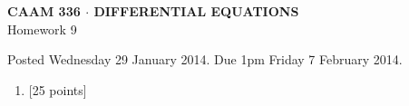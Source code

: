 \documentclass[10pt]{article}
\begin{document}
\vspace*{-5em}
\begin{center}
\large \textsf{\textbf{CAAM 336 $\cdot$ DIFFERENTIAL EQUATIONS}\\[0.5em]
Homework 9 }
\end{center}

Posted Wednesday 29 January 2014.  Due 1pm Friday 7 February 2014.

\begin{enumerate}\addtocounter{enumi}{8}
\item {[25 points]}\\  

\end{enumerate}
\end{document}
